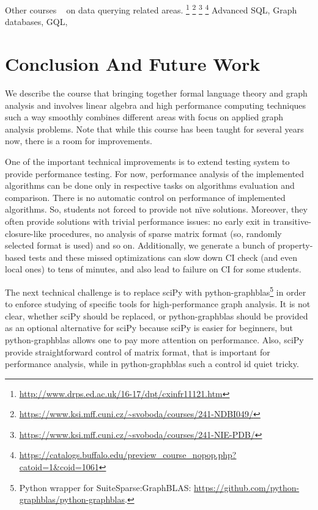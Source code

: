 \documentclass[sigconf]{acmart}
\begin{document}
Other courses ~\cite{Figueira2022} on data querying related areas.
\footnote{\url{http://www.drps.ed.ac.uk/16-17/dpt/cxinfr11121.htm}}
\footnote{\url{https://www.ksi.mff.cuni.cz/~svoboda/courses/241-NDBI049/}}
\footnote{\url{https://www.ksi.mff.cuni.cz/~svoboda/courses/241-NIE-PDB/}}
\footnote{\url{https://catalogs.buffalo.edu/preview_course_nopop.php?catoid=1&coid=1061}}
Advanced SQL, Graph databases, GQL, 

\section{Conclusion And Future Work}

We describe the course that bringing together formal language theory and graph analysis and involves linear algebra and high performance computing techniques such a way smoothly combines different areas with focus on applied graph analysis problems. 
Note that while this course has been taught for several years now, there is a room for improvements.

One of the important technical improvements is to extend testing system to provide performance testing. 
For now, performance analysis of the implemented algorithms can be done only in respective tasks on algorithms evaluation and comparison.
There is no automatic control on performance of implemented algorithms. 
So, students not forced to provide not n\"ive solutions.
Moreover, they often provide solutions with trivial performance issues: no early exit in transitive-closure-like procedures, no analysis of sparse matrix format (so, randomly selected format is used) and so on.
Additionally, we generate a bunch of property-based tests and these missed optimizations can slow down CI check (and even local ones) to tens of minutes, and also lead to failure on CI for some students.

The next technical challenge is to replace sciPy with python-graphblas\footnote{Python wrapper for SuiteSparse:GraphBLAS: \url{https://github.com/python-graphblas/python-graphblas}.} in order to enforce studying of specific tools for high-performance graph analysis. 
It is not clear, whether sciPy should be replaced, or python-graphblas should be provided as an optional alternative for sciPy because sciPy is easier for beginners, but python-graphblas allows one to pay more attention on performance.
Also, sciPy provide straightforward control of matrix format, that is important for performance analysis, while in python-graphblas such a control id quiet tricky.
\end{document}
